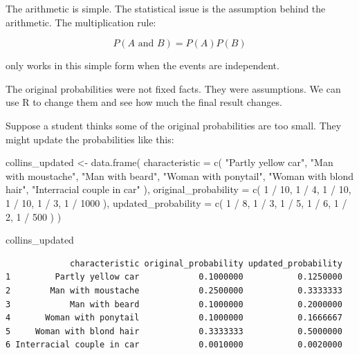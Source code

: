 \documentclass[
  letterpaper,
  DIV=11,
  numbers=noendperiod]{scrreprt}
\newenvironment{Shaded}{\begin{snugshade}}{\end{snugshade}}
\newcommand{\AttributeTok}[1]{\textcolor[rgb]{0.40,0.45,0.13}{#1}}
\newcommand{\DecValTok}[1]{\textcolor[rgb]{0.68,0.00,0.00}{#1}}
\newcommand{\FunctionTok}[1]{\textcolor[rgb]{0.28,0.35,0.67}{#1}}
\newcommand{\NormalTok}[1]{\textcolor[rgb]{0.00,0.23,0.31}{#1}}
\newcommand{\OtherTok}[1]{\textcolor[rgb]{0.00,0.23,0.31}{#1}}
\newcommand{\SpecialCharTok}[1]{\textcolor[rgb]{0.37,0.37,0.37}{#1}}
\newcommand{\StringTok}[1]{\textcolor[rgb]{0.13,0.47,0.30}{#1}}
\begin{document}
The arithmetic is simple. The statistical issue is the assumption behind
the arithmetic. The multiplication rule:

\[P(A \text{ and } B) = P(A)P(B)\]

only works in this simple form when the events are independent.

The original probabilities were not fixed facts. They were assumptions.
We can use R to change them and see how much the final result changes.

Suppose a student thinks some of the original probabilities are too
small. They might update the probabilities like this:

\begin{Shaded}
\begin{Highlighting}[]
\NormalTok{collins\_updated }\OtherTok{\textless{}{-}} \FunctionTok{data.frame}\NormalTok{(}
  \AttributeTok{characteristic =} \FunctionTok{c}\NormalTok{(}
    \StringTok{"Partly yellow car"}\NormalTok{,}
    \StringTok{"Man with moustache"}\NormalTok{,}
    \StringTok{"Man with beard"}\NormalTok{,}
    \StringTok{"Woman with ponytail"}\NormalTok{,}
    \StringTok{"Woman with blond hair"}\NormalTok{,}
    \StringTok{"Interracial couple in car"}
\NormalTok{  ),}
  \AttributeTok{original\_probability =} \FunctionTok{c}\NormalTok{(}
    \DecValTok{1} \SpecialCharTok{/} \DecValTok{10}\NormalTok{,}
    \DecValTok{1} \SpecialCharTok{/} \DecValTok{4}\NormalTok{,}
    \DecValTok{1} \SpecialCharTok{/} \DecValTok{10}\NormalTok{,}
    \DecValTok{1} \SpecialCharTok{/} \DecValTok{10}\NormalTok{,}
    \DecValTok{1} \SpecialCharTok{/} \DecValTok{3}\NormalTok{,}
    \DecValTok{1} \SpecialCharTok{/} \DecValTok{1000}
\NormalTok{  ),}
  \AttributeTok{updated\_probability =} \FunctionTok{c}\NormalTok{(}
    \DecValTok{1} \SpecialCharTok{/} \DecValTok{8}\NormalTok{,}
    \DecValTok{1} \SpecialCharTok{/} \DecValTok{3}\NormalTok{,}
    \DecValTok{1} \SpecialCharTok{/} \DecValTok{5}\NormalTok{,}
    \DecValTok{1} \SpecialCharTok{/} \DecValTok{6}\NormalTok{,}
    \DecValTok{1} \SpecialCharTok{/} \DecValTok{2}\NormalTok{,}
    \DecValTok{1} \SpecialCharTok{/} \DecValTok{500}
\NormalTok{  )}
\NormalTok{)}

\NormalTok{collins\_updated}
\end{Highlighting}
\end{Shaded}

\begin{verbatim}
             characteristic original_probability updated_probability
1         Partly yellow car            0.1000000           0.1250000
2        Man with moustache            0.2500000           0.3333333
3            Man with beard            0.1000000           0.2000000
4       Woman with ponytail            0.1000000           0.1666667
5     Woman with blond hair            0.3333333           0.5000000
6 Interracial couple in car            0.0010000           0.0020000
\end{verbatim}
\end{document}
